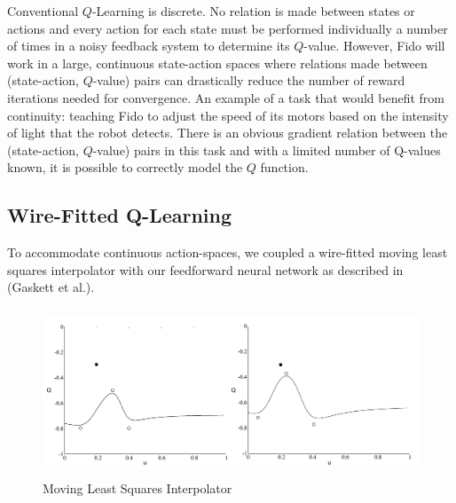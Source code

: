 Conventional $Q$-Learning is discrete. No relation is made between states or actions and every action for each state must be performed individually a number of times in a noisy feedback system to determine its $Q$-value. However, Fido will work in a large, continuous state-action spaces where relations made between (state-action, $Q$-value) pairs can drastically reduce the number of reward iterations needed for convergence. An example of a task that would benefit from continuity: teaching Fido to adjust the speed of its motors based on the intensity of light that the robot detects. There is an obvious gradient relation between the (state-action, $Q$-value) pairs in this task and with a limited number of Q-values known, it is possible to correctly model the $Q$ function.

\subsection{Wire-Fitted Q-Learning}

To accommodate continuous action-spaces, we coupled a wire-fitted moving least squares interpolator with our feedforward neural network as described in (Gaskett et al.).

\begin{figure}[ht]
    \centering
    \includegraphics[height=5cm]{Figures/WireFit.png}
    \caption{Moving Least Squares Interpolator}
\end{figure}